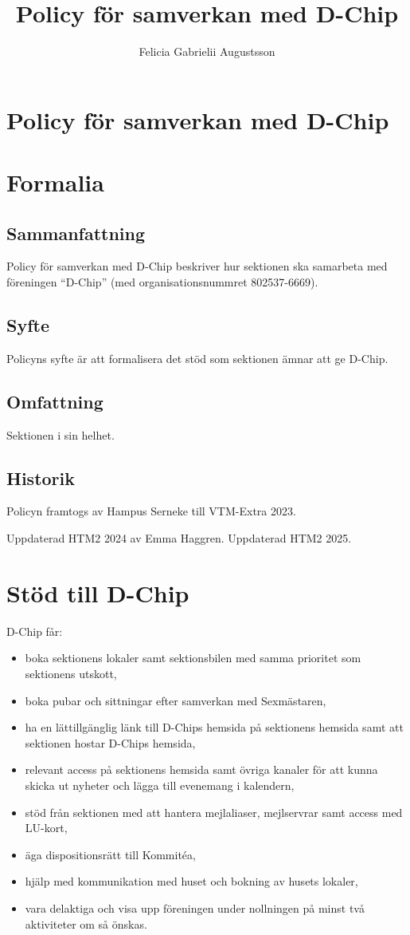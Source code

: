 \documentclass{dsekprotokoll}
\title{Policy för samverkan med D-Chip}
\author{Felicia Gabrielii Augustsson}
\begin{document}
\section*{Policy för samverkan med D-Chip}
\section{Formalia}
\subsection{Sammanfattning}
Policy för samverkan med D-Chip beskriver hur sektionen ska samarbeta
med föreningen “D-Chip” (med organisationsnummret 802537-6669).
\subsection{Syfte}
Policyns syfte är att formalisera det stöd som sektionen ämnar att ge D-Chip.
\subsection{Omfattning}
Sektionen i sin helhet.

\subsection{Historik}

Policyn framtogs av Hampus Serneke till VTM-Extra 2023.

Uppdaterad HTM2 2024 av Emma Haggren. Uppdaterad HTM2 2025.

\section{Stöd till D-Chip}

D-Chip får:

\begin{itemize}
  \item boka sektionens lokaler samt sektionsbilen med samma
    prioritet som sektionens utskott,
  \item boka pubar och sittningar efter samverkan med Sexmästaren,
  \item ha en lättillgänglig länk till D-Chips hemsida på sektionens
    hemsida samt att sektionen hostar D-Chips hemsida,
  \item relevant access på sektionens hemsida samt övriga kanaler för
    att kunna skicka ut nyheter och lägga till evenemang i kalendern,
  \item stöd från sektionen med att hantera mejlaliaser, mejlservrar
    samt access med LU-kort,
  \item äga dispositionsrätt till Kommitéa,
  \item hjälp med kommunikation med huset och bokning av husets lokaler,
  \item vara delaktiga och visa upp föreningen under nollningen på
    minst två aktiviteter om så önskas.
\end{itemize}
\end{document}
